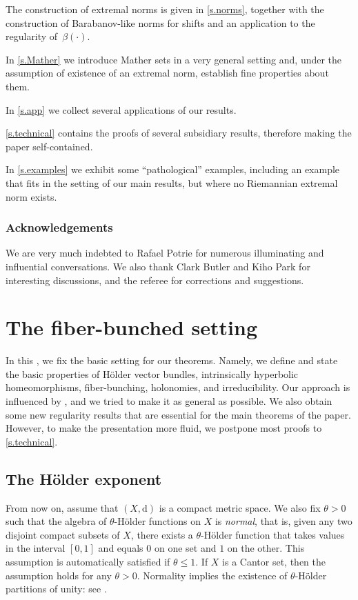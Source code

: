 \documentclass[JEP,XML,SOM,Unicode]{cedram}
\theoremstyle{plain}
\theoremstyle{definition}
\newcommand{\dd}{\mathrm{d}}
\begin{document}
The construction of extremal norms is given in \cref{s.norms}, together with the construction of Barabanov-like norms for shifts and an application to the regularity of~$\beta (\mathord{\cdot})$.

In \cref{s.Mather} we introduce Mather sets in a very general setting and, under the assumption of existence of an extremal norm, establish fine properties about them.

In \cref{s.app} we collect several applications of our results.

\cref{s.technical} contains the proofs of several subsidiary results, therefore making the paper self-contained.

In \cref{s.examples} we exhibit some ``pathological'' examples, including an example that fits in the setting of our main results, but where no Riemannian extremal norm exists.

\subsubsection*{Acknowledgements}
We are very much indebted to Rafael Potrie for numerous illuminating and influential conversations. We also thank Clark Butler and Kiho Park for interesting discussions, and the referee for corrections and suggestions.

\section{The fiber-bunched setting}\label{s.setting}

In this , we fix the basic setting for our theorems. Namely, we define and state the basic properties of Hölder vector bundles, intrinsically hyperbolic homeomorphisms, fiber-bunching, holonomies, and irreducibility. Our approach is influenced by \cite{BGV,Viana,KalSad}, and we tried to make it as general as possible.
We also obtain some new regularity results that are essential for the main theorems of the paper.
However, to make the presentation more fluid, we postpone most proofs to \cref{s.technical}.

\subsection{The Hölder exponent}\label{ss.theta}

From now on, assume that $(X,\dd)$ is a compact metric space.
We also fix $\theta > 0$ such that
the algebra of $\theta$-Hölder functions on $X$ is \emph{normal},
that is, given any two disjoint compact subsets of $X$, there exists a $\theta$-Hölder function that takes values in the interval $[0,1]$ and equals $0$ on one set and $1$ on the other. This assumption is automatically satisfied if $\theta \le 1$. If $X$ is a Cantor set, then the assumption holds for any $\theta>0$.
Normality implies the existence of $\theta$-Hölder partitions of unity: see \eg \cite[p.\,221]{Katz}.
\end{document}
